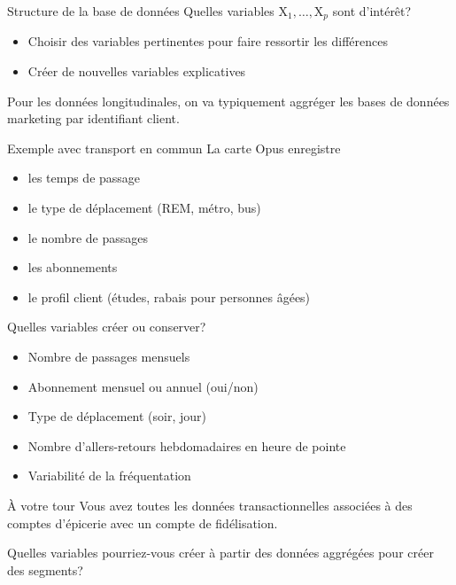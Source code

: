 \documentclass[
  ignorenonframetext,
]{beamer}
\providecommand{\tightlist}{%
  \setlength{\itemsep}{0pt}\setlength{\parskip}{0pt}}\usepackage{longtable,booktabs,array}
\begin{document}
\begin{frame}{Structure de la base de données}
\protect\hypertarget{structure-de-la-base-de-donnuxe9es}{}
Quelles variables \(\mathrm{X}_1, \ldots, \mathrm{X}_p\) sont d'intérêt?

\begin{itemize}
\tightlist
\item
  Choisir des variables pertinentes pour faire ressortir les différences
\item
  Créer de nouvelles variables explicatives
\end{itemize}

Pour les données longitudinales, on va typiquement aggréger les bases de
données marketing par identifiant client.
\end{frame}

\begin{frame}{Exemple avec transport en commun}
\protect\hypertarget{exemple-avec-transport-en-commun}{}
La carte Opus enregistre

\begin{itemize}
\tightlist
\item
  les temps de passage
\item
  le type de déplacement (REM, métro, bus)
\item
  le nombre de passages
\item
  les abonnements
\item
  le profil client (études, rabais pour personnes âgées)
\end{itemize}
\end{frame}

\begin{frame}{Quelles variables créer ou conserver?}
\protect\hypertarget{quelles-variables-cruxe9er-ou-conserver}{}
\begin{itemize}
\tightlist
\item
  Nombre de passages mensuels
\item
  Abonnement mensuel ou annuel (oui/non)
\item
  Type de déplacement (soir, jour)
\item
  Nombre d'allers-retours hebdomadaires en heure de pointe
\item
  Variabilité de la fréquentation
\end{itemize}
\end{frame}

\begin{frame}{À votre tour}
\protect\hypertarget{uxe0-votre-tour}{}
Vous avez toutes les données transactionnelles associées à des comptes
d'épicerie avec un compte de fidélisation.

Quelles variables pourriez-vous créer à partir des données aggrégées
pour créer des segments?
\end{frame}
\end{document}
